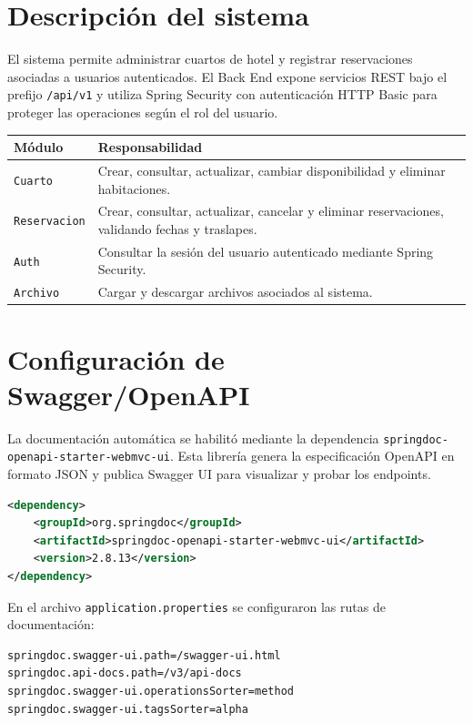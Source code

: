 \documentclass[10pt,a4paper]{article}
\newcommand{\cod}[1]{\texttt{\scriptsize #1}}
\begin{document}
\section{Descripción del sistema}

El sistema permite administrar cuartos de hotel y registrar reservaciones asociadas a usuarios autenticados. El Back End expone servicios REST bajo el prefijo \cod{/api/v1} y utiliza Spring Security con autenticación HTTP Basic para proteger las operaciones según el rol del usuario.

\begin{longtable}{|>{\raggedright\arraybackslash}p{}|>{\raggedright\arraybackslash}p{}|}
\hline
\rowcolor{cyan!20}
\textbf{Módulo} & \textbf{Responsabilidad}\\
\hline
\texttt{Cuarto} & Crear, consultar, actualizar, cambiar disponibilidad y eliminar habitaciones.\\
\hline
\texttt{Reservacion} & Crear, consultar, actualizar, cancelar y eliminar reservaciones, validando fechas y traslapes.\\
\hline
\texttt{Auth} & Consultar la sesión del usuario autenticado mediante Spring Security.\\
\hline
\texttt{Archivo} & Cargar y descargar archivos asociados al sistema.\\
\hline
\end{longtable}

\section{Configuración de Swagger/OpenAPI}

La documentación automática se habilitó mediante la dependencia \cod{springdoc-openapi-starter-webmvc-ui}. Esta librería genera la especificación OpenAPI en formato JSON y publica Swagger UI para visualizar y probar los endpoints.

\begin{lstlisting}[language=XML,caption={Dependencia usada para integrar Springdoc OpenAPI.}]
<dependency>
    <groupId>org.springdoc</groupId>
    <artifactId>springdoc-openapi-starter-webmvc-ui</artifactId>
    <version>2.8.13</version>
</dependency>
\end{lstlisting}

En el archivo \cod{application.properties} se configuraron las rutas de documentación:

\begin{lstlisting}[language=bash,caption={Rutas de Swagger UI y OpenAPI JSON.}]
springdoc.swagger-ui.path=/swagger-ui.html
springdoc.api-docs.path=/v3/api-docs
springdoc.swagger-ui.operationsSorter=method
springdoc.swagger-ui.tagsSorter=alpha
\end{lstlisting}
\end{document}
